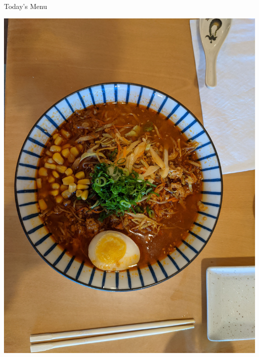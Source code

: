 \documentclass{beamer}
\begin{document}
\begin{frame}{Today's Menu}
    \begin{minipage}[t][0.6\textheight]{0.6\textwidth}
        \vspace{0pt} 
        \tableofcontents[hideallsubsections]
    \end{minipage}
    \begin{minipage}[t]{0.35\textwidth} 
        \vspace{3pt}  
        \includegraphics[width=.9\textwidth]{ramen1.jpg}

\end{minipage}
\end{frame}
\end{document}
